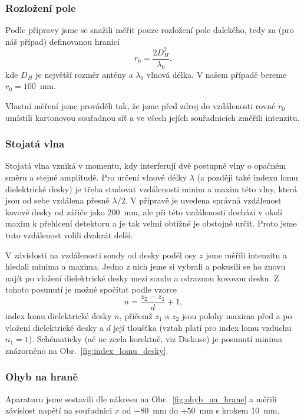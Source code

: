 \documentclass[english]{article}
\begin{document}
			\subsubsection{Rozložení pole}
					Podle přípravy jsme se snažili měřit pouze rozložení pole dalekého, tedy za (pro náš případ) definovanou hranicí 
					\begin{equation}
					r_0 = \frac{2 D_H^2}{\lambda_0},
					\end{equation}
					kde $D_H$ je největší rozměr antény a $\lambda_0$ vlnová délka. V našem případě bereme $r_0 = 100$~mm.
					
				    Vlastní měření jsme prováděli tak, že jsme před zdroj do vzdálenosti rovné $r_0$ umístili kartonovou souřadnou síť a ve všech jejích souřadnicích změřili intenzitu. 
					
			\subsubsection{Stojatá vlna}
					Stojatá vlna vzniká v momentu, kdy interferují dvě postupné vlny o opačném směru a stejné amplitudě. Pro určení vlnové délky $\lambda$ (a později také indexu lomu dielektrické desky) je třeba studovat vzdálenosti minim a maxim této vlny, která jsou od sebe vzdálena přesně $\lambda/2$. V přípravě je uvedena správná vzdálenost kovové desky od zářiče jako 200~mm, ale při této vzdálenosti dochází v okolí maxim k přehlcení detektoru a je tak velmi obtížné je obstojně určit. Proto jsme tuto vzdálenost volili dvakrát delší.
					
					V závislosti na vzdálenosti sondy od desky podél osy $z$ jsme měřili intenzitu a hledali minima a maxima. Jedno z nich jsme si vybrali a pokusili se ho znovu najít po vložení dielektrické desky mezi sondu a odraznou kovovou desku. Z tohoto posunutí je možné spočítat podle vzorce
					\begin{equation}
					n = \frac{z_2 - z_1}{d} + 1,
					\label{eq:index_lomu}
					\end{equation}
					index lomu dielektrické desky $n$, přičemž $z_1$ a $z_2$ jsou polohy maxima před a po vložení dielektrické desky a $d$ její tloušťka (vztah platí pro index lomu vzduchu $n_1=1$). Schématicky (ač ne zcela korektně, viz Diskuse) je posunutí minima znázorněno na Obr.~\ref{fig:index_lomu_desky}.
					
			\subsubsection{Ohyb na hraně}
					Aparaturu jsme sestavili dle nákresu na Obr.~\ref{fig:ohyb_na_hrane} a měřili závislost napětí na souřadnici $x$ od $-80$~mm do $+50$~mm s krokem 10~mm.
			
\end{document}
